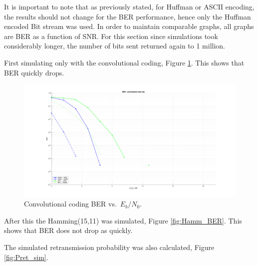 It is important to note that as previously stated, for Huffman or ASCII encoding, the results should not change for the BER performance, hence only the Huffman encoded Bit stream was used. In order to maintain comparable graphs, all graphs are BER as a function of SNR. For this section since simulations took considerably longer, the number of bits sent returned again to 1 million.

First simulating only with the convolutional coding, Figure \ref{fig:Conv_BER}. This shows that BER quickly drops.

\begin{figure}[H]
  \centering
  \includegraphics[width=0.7\linewidth]{Images/ConvCode.png}
  \caption{Convolutional  coding BER vs.\ $E_b/N_0$.}
  \label{fig:Conv_BER}
\end{figure}

After this the Hamming(15,11) was simulated, Figure \ref{fig:Hamm_BER}. This shows that BER does not drop as quickly.

The simulated retransmission probability was also calculated, Figure \ref{fig:Pret_sim}.


